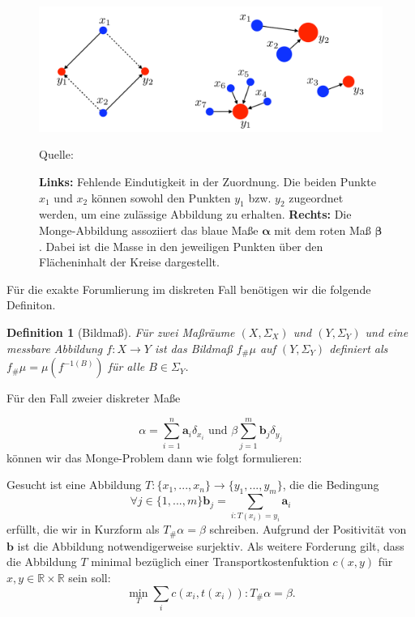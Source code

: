 \documentclass[11pt,a4paper]{article}
\newcommand{\source}[1]{\caption*{\small \hfill Quelle: {#1}} }
\newtheorem{definition}[theorem]{Definition}
\numberwithin{equation}{section}
\begin{document}
	\begin{figure}[ht]
		\centering
		\includegraphics[width=0.3\textheight]{monge_mapping.png}
		\caption[Monge-Abbildung]{\textbf{Links:} Fehlende Eindutigkeit in der Zuordnung. Die beiden Punkte $x_1$ und $x_2$ können sowohl den Punkten $y_1$ bzw. $y_2$ zugeordnet werden, um eine zulässige Abbildung zu erhalten. \textbf{Rechts:} Die Monge-Abbildung assoziiert das blaue Maße $\boldsymbol{\alpha}$ mit dem roten Maß $\boldsymbol{\beta}$. Dabei ist die Masse in den jeweiligen Punkten über den Flächeninhalt der Kreise dargestellt.}
		\source{\cite{COTcuturi}}
		\label{im:monge_mapping}
	\end{figure}

	Für die exakte Forumlierung im diskreten Fall benötigen wir die folgende Definiton.
	
	\begin{definition}[Bildmaß]
		Für zwei Maßräume $(X,\Sigma_X)$ und $(Y,\Sigma_Y)$ und eine messbare Abbildung $f:X\to Y$ ist das Bildmaß $f_\#\mu$ auf $(Y,\Sigma_Y)$ definiert als $f_\#\mu = \mu (f^{-1(B)})$ für alle $B \in \Sigma_Y$.
	\end{definition}

	Für den Fall zweier diskreter Maße
	
	\begin{equation}
		\alpha = \sum_{i=1}^n{\boldsymbol{a}_i\delta_{x_i}} \text{ und } \beta \sum_{j=1}^m{\boldsymbol{b}_j\delta_{y_j}}
	\end{equation}
	können wir das Monge-Problem dann wie folgt formulieren:
	
	Gesucht ist eine Abbildung $T:\lbrace x_1, ..., x_n \rbrace \to \lbrace y_1,...,y_m \rbrace$, die die Bedingung 
	\begin{equation}
		\forall j \in \lbrace 1,...,m \rbrace \boldsymbol{b}_j= \sum_{i:T(x_i)=y_i}{\boldsymbol{a}_i}
	\end{equation}
	erfüllt, die wir in Kurzform als $T_\#\alpha = \beta$ schreiben. Aufgrund der Positivität von $\boldsymbol{b}$ ist die Abbildung notwendigerweise surjektiv.
	Als weitere Forderung gilt, dass die Abbildung $T$ minimal bezüglich einer Transportkostenfuktion $c(x,y)$ für $x,y \in \mathbb{R} \times \mathbb{R}$ sein soll:
	\begin{equation}
		\min_T{\sum_i{c(x_i, t(x_i)) : T_\#\alpha =  \beta}}.
	\end{equation} 
	
\end{document}

